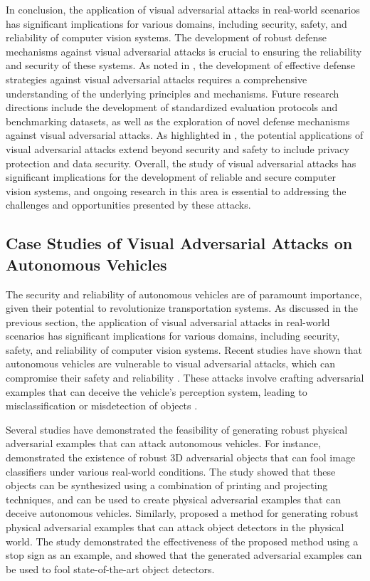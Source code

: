 \documentclass[11pt,a4paper]{article}
\begin{document}
In conclusion, the application of visual adversarial attacks in real-world scenarios has significant implications for various domains, including security, safety, and reliability of computer vision systems. The development of robust defense mechanisms against visual adversarial attacks is crucial to ensuring the reliability and security of these systems. As noted in \cite{doi:10.1145/3459637.3482029}, the development of effective defense strategies against visual adversarial attacks requires a comprehensive understanding of the underlying principles and mechanisms. Future research directions include the development of standardized evaluation protocols and benchmarking datasets, as well as the exploration of novel defense mechanisms against visual adversarial attacks. As highlighted in \cite{arxiv:2101.07922}, the potential applications of visual adversarial attacks extend beyond security and safety to include privacy protection and data security. Overall, the study of visual adversarial attacks has significant implications for the development of reliable and secure computer vision systems, and ongoing research in this area is essential to addressing the challenges and opportunities presented by these attacks.


\subsection{Case Studies of Visual Adversarial Attacks on Autonomous Vehicles}


The security and reliability of autonomous vehicles are of paramount importance, given their potential to revolutionize transportation systems. As discussed in the previous section, the application of visual adversarial attacks in real-world scenarios has significant implications for various domains, including security, safety, and reliability of computer vision systems. Recent studies have shown that autonomous vehicles are vulnerable to visual adversarial attacks, which can compromise their safety and reliability \cite{arxiv:1707.08945}. These attacks involve crafting adversarial examples that can deceive the vehicle's perception system, leading to misclassification or misdetection of objects \cite{doi:10.24963/ijcai.2021/694}.

Several studies have demonstrated the feasibility of generating robust physical adversarial examples that can attack autonomous vehicles. For instance, \cite{arxiv:1707.07397} demonstrated the existence of robust 3D adversarial objects that can fool image classifiers under various real-world conditions. The study showed that these objects can be synthesized using a combination of printing and projecting techniques, and can be used to create physical adversarial examples that can deceive autonomous vehicles. Similarly, \cite{arxiv:1707.08945} proposed a method for generating robust physical adversarial examples that can attack object detectors in the physical world. The study demonstrated the effectiveness of the proposed method using a stop sign as an example, and showed that the generated adversarial examples can be used to fool state-of-the-art object detectors.
\end{document}
